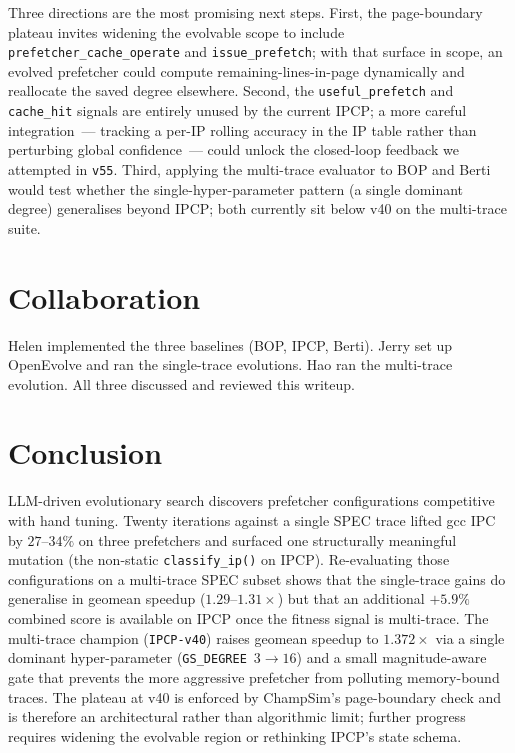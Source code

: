 \documentclass[11pt]{article}
\begin{document}
Three directions are the most promising next steps. First, the
page-boundary plateau invites widening the evolvable scope to include
\texttt{prefetcher\_cache\_operate} and \texttt{issue\_prefetch}; with
that surface in scope, an evolved prefetcher could compute
remaining-lines-in-page dynamically and reallocate the saved degree
elsewhere. Second, the \texttt{useful\_prefetch} and \texttt{cache\_hit}
signals are entirely unused by the current IPCP; a more careful
integration~--- tracking a per-IP rolling accuracy in the IP table
rather than perturbing global confidence~--- could unlock the
closed-loop feedback we attempted in \texttt{v55}. Third, applying the
multi-trace evaluator to BOP and Berti would test whether the
single-hyper-parameter pattern (a single dominant degree) generalises
beyond IPCP; both currently sit below v40 on the multi-trace suite.

\section{Collaboration}

Helen implemented the three baselines (BOP, IPCP, Berti). Jerry set up
OpenEvolve and ran the single-trace evolutions. Hao ran the multi-trace
evolution. All three discussed and reviewed this writeup.

\section{Conclusion}

LLM-driven evolutionary search discovers prefetcher configurations
competitive with hand tuning. Twenty iterations against a single SPEC
trace lifted gcc IPC by $27$--$34\%$ on three prefetchers and surfaced
one structurally meaningful mutation (the non-static
\texttt{classify\_ip()} on IPCP). Re-evaluating those configurations on
a multi-trace SPEC subset shows that the single-trace gains do generalise
in geomean speedup ($1.29$--$1.31\times$) but that an additional
$+5.9\%$ combined score is available on IPCP once the fitness signal is
multi-trace. The multi-trace champion (\texttt{IPCP-v40}) raises geomean
speedup to $1.372\times$ via a single dominant hyper-parameter
(\texttt{GS\_DEGREE}~$3{\to}16$) and a small magnitude-aware gate that
prevents the more aggressive prefetcher from polluting memory-bound
traces. The plateau at v40 is enforced by ChampSim's page-boundary
check and is therefore an architectural rather than algorithmic limit;
further progress requires widening the evolvable region or rethinking
IPCP's state schema.
\end{document}
